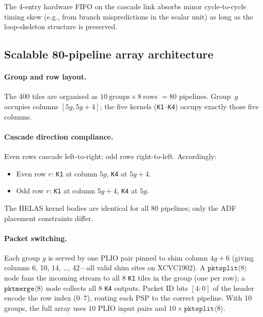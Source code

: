 The 4-entry hardware FIFO on the cascade link absorbs minor cycle-to-cycle
timing skew (e.g., from branch mispredictions in the scalar unit) as long as
the loop-skeleton structure is preserved.

\subsection{Scalable 80-pipeline array architecture}\label{sec:array}

\paragraph{Group and row layout.}
The 400 \aie tiles are organised as $10\ \text{groups} \times 8\ \text{rows}$
$= 80$ pipelines.  Group~$g$ occupies columns $[5g, 5g+4]$; the five kernels
(\texttt{K1}--\texttt{K4}) occupy exactly those five columns.

\paragraph{Cascade direction compliance.}
Even rows cascade left-to-right; odd rows right-to-left.  Accordingly:
\begin{itemize}
  \item Even row $r$: \texttt{K1} at column $5g$, \texttt{K4} at $5g+4$.
  \item Odd row $r$: \texttt{K1} at column $5g+4$, \texttt{K4} at $5g$.
\end{itemize}
The HELAS kernel bodies are identical for all 80 pipelines; only the ADF
placement constraints differ.

\paragraph{Packet switching.}
Each group $g$ is served by one PLIO pair pinned to shim column $4g+6$
(giving columns 6, 10, 14, \ldots, 42---all valid shim sites on XCVC1902).  A
$\texttt{pktsplit}\langle 8\rangle$ node fans the incoming stream to all 8
\texttt{K1} tiles in the group (one per row); a $\texttt{pktmerge}\langle
8\rangle$ node collects all 8 \texttt{K4} outputs.  Packet ID bits
$[4:0]$ of the header encode the row index (0--7), routing each PSP to the
correct pipeline.  With 10 groups, the full array uses $10$ PLIO input pairs and
$10\times\texttt{pktsplit}\langle 8\rangle$.

